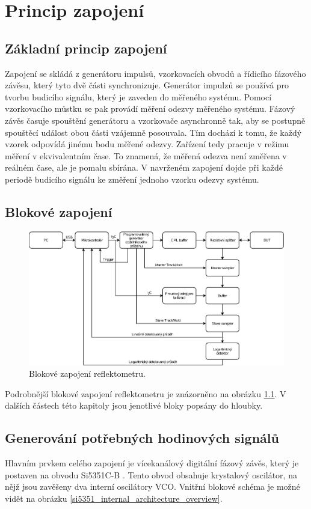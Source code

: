 \chapter{Princip zapojení}

\section{Základní princip zapojení}
Zapojení se skládá z generátoru impulsů, vzorkovacích obvodů a řídicího fázového závěsu, který tyto dvě části synchronizuje. Generátor impulzů se používá pro tvorbu budicího signálu, který je zaveden do měřeného systému. Pomocí vzorkovacího můstku se pak provádí měření odezvy měřeného systému. Fázový závěs časuje spouštění generátoru a vzorkovače asynchronně tak, aby se postupně spouštěcí událost obou části vzájemně posouvala. Tím dochází k tomu, že každý vzorek odpovídá jinému bodu měřené odezvy. Zařízení tedy pracuje v režimu měření v ekvivalentním čase. To znamená, že měřená odezva není změřena v reálném čase, ale je pomalu sbírána. V navrženém zapojení dojde při každé periodě budicího signálu ke změření jednoho vzorku odezvy systému.

\section{Blokové zapojení}
\begin{figure}[htbp]
\includegraphics[width=\textwidth,keepaspectratio]{images/block_diagram.eps}\caption{Blokové zapojení reflektometru.} \label{block_diagram}
\end{figure}

Podrobnější blokové zapojení reflektometru je znázorněno na obrázku \ref{block_diagram}. V dalších částech této kapitoly jsou jenotlivé bloky popsány do hloubky.

\section{Generování potřebných hodinových signálů}
Hlavním prvkem celého zapojení je vícekanálový digitální fázový závěs, který je postaven na obvodu Si5351C-B \cite{Si5351datasheet}. Tento obvod obsahuje krystalový oscilátor, na nějž jsou zavěšeny dva interní oscilátory \acrshort{VCO}. Vnitřní blokové schéma je možné vidět na obrázku \ref{si5351_internal_architecture_overview}.

